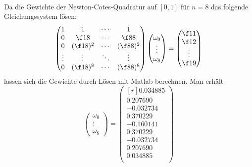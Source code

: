\documentclass[a4paper]{scrartcl}
\begin{document}
\begin{aufgabe}~

	Da die Gewichte der Newton-Cotes-Quadratur auf $[0,1]$ für $n=8$ das folgende Gleichungssystem lösen:
	\begin{align*}
		\begin{pmatrix}
			1 & 1 & \cdots & 1 \\
			0 & \f 18 & \cdots & \f 88 \\
			0 & (\f 18)^2 & \cdots & (\f 88)^2 \\
			\vdots & \vdots & \ddots & \vdots \\
			0 & (\f 18)^8 & \cdots & (\f 88)^8 
		\end{pmatrix}
		\begin{pmatrix}
			\omega_0 \\ \vdots \\ \omega_8
		\end{pmatrix}
		=
		\begin{pmatrix}
			\f 11 \\ \f 12 \\ \vdots \\ \f 19
		\end{pmatrix}
	\end{align*}
	lassen sich die Gewichte durch Lösen mit Matlab berechnen.
	Man erhält
	\[
		\begin{pmatrix}
			\omega_0 \\ \vdots \\ \omega_8
		\end{pmatrix}
		=
		\begin{pmatrix}[r]
			0.034885 \\
			0.207690\\
			-0.032734\\
			0.370229\\
			-0.160141\\
			0.370229\\
			-0.032734\\
			0.207690\\
			0.034885\\
   		\end{pmatrix}
	\]
\end{aufgabe}
\end{document}
